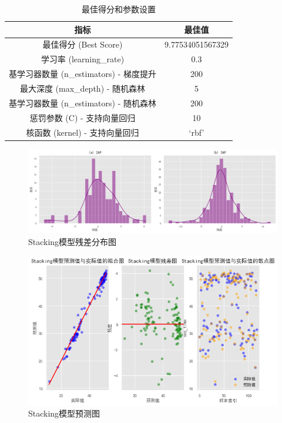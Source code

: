 \documentclass[bwprint]{gmcmthesis}
\begin{document}
\begin{table}[H]
	\centering
	\caption{最佳得分和参数设置}
	\begin{tabular}{cc}
		\toprule
		指标 & 最佳值 \\
		\midrule
		最佳得分 (Best Score) & 9.77534051567329 \\
		学习率 (learning\_rate) & 0.3 \\
		基学习器数量 (n\_estimators) - 梯度提升 & 200 \\
		最大深度 (max\_depth) - 随机森林 & 5 \\
		基学习器数量 (n\_estimators) - 随机森林 & 200 \\
		惩罚参数 (C) - 支持向量回归 & 10 \\
		核函数 (kernel) - 支持向量回归 & `rbf' \\
		\bottomrule
	\end{tabular}
\end{table}





\begin{figure}[H]
	\centering
	\includegraphics[width=0.9\linewidth]{figures/2ap和3ap残差图}
	\caption{Stacking模型残差分布图}
	\label{fig:2ap3ap}
\end{figure}


\begin{figure}[H]
	\centering
	\includegraphics[width=0.8\linewidth]{figures/2ap结果}
	\caption{Stacking模型预测图}
	\label{fig:2ap}
\end{figure}
\end{document}
